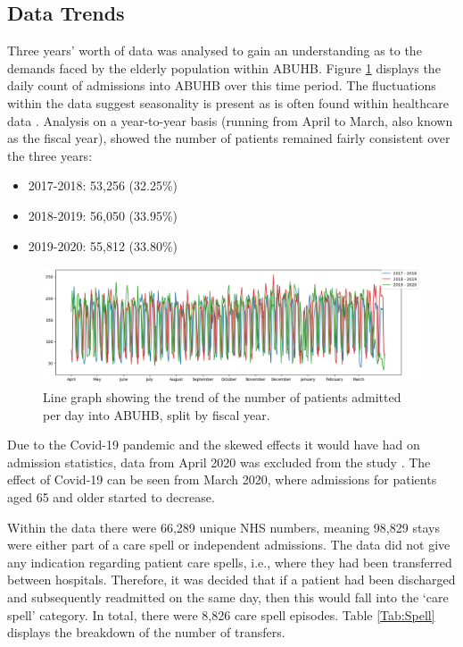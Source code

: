 \documentclass[../thesis.tex]{subfiles}
\begin{document}
\subsection{Data Trends}\label{sec:datatrends}
Three years' worth of data was analysed to gain an understanding as to the demands faced by the elderly population within ABUHB. Figure \ref{fig:AdmissionCount} displays the daily count of admissions into ABUHB over this time period. The fluctuations within the data suggest seasonality is present as is often found within healthcare data \cite{Upshur2005}. Analysis on a year-to-year basis (running from April to March, also known as the fiscal year), showed the number of patients remained fairly consistent over the three years:
\begin{itemize}
    \item 2017-2018: 53,256 (32.25\%)
    \item 2018-2019: 56,050 (33.95\%)
    \item 2019-2020: 55,812 (33.80\%)
\end{itemize}

\begin{figure}[h!]
    \centering
    \includegraphics[width=\textwidth]{Chapters/Chapter5/Figures/Admission each year.png}
    \caption{Line graph showing the trend of the number of patients admitted per day into ABUHB, split by fiscal year.}
    \label{fig:AdmissionCount}
\end{figure}

Due to the Covid-19 pandemic and the skewed effects it would have had on admission statistics, data from April 2020 was excluded from the study \cite{Venkatesan2020}. The effect of Covid-19 can be seen from March 2020, where admissions for patients aged 65 and older started to decrease.

Within the data there were 66,289 unique NHS numbers, meaning 98,829 stays were either part of a care spell or independent admissions. The data did not give any indication regarding patient care spells, i.e., where they had been transferred between hospitals. Therefore, it was decided that if a patient had been discharged and subsequently readmitted on the same day, then this would fall into the `care spell’ category. In total, there were 8,826 care spell episodes. Table \ref{Tab:Spell} displays the breakdown of the number of transfers.
\end{document}
